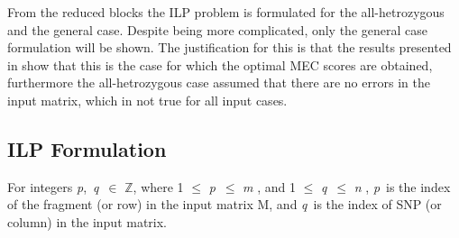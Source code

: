 \documentclass[10pt,twocolumn]{witseiepaper}
\newcommand{\M}{\textit{m }}
\newcommand{\N}{\textit{n }}
\newcommand{\PP}{\textit{p}}
\newcommand{\QQ}{\textit{q}}
\begin{document}
From the reduced blocks the ILP problem is formulated for the all-hetrozygous and the general case. Despite
being more complicated, only the general case formulation will be shown. The justification for this is that  
the results presented in \cite{chen:2013} show that this is the case for which the optimal MEC scores are 
obtained, furthermore the all-hetrozygous case assumed that there are no errors in the input matrix, which
in not true for all input cases.

\subsection{ ILP Formulation } \label{ssec:ilpform}

For integers \PP,\ \QQ\ $\in$ $\mathbb{Z}$, where 1 $\le$ \PP\ $\le$ \M, and 1 $\le$ \QQ\ $\le$ \N, \PP\ is the 
index of the fragment (or row) in the input matrix M, and \QQ\ is the index of SNP (or column) in the input 
matrix.




\end{document}

